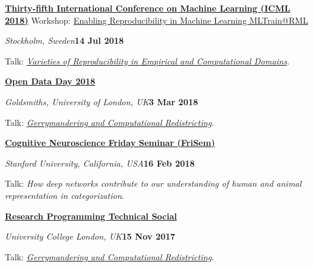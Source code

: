 \documentclass[10pt]{article}
\newenvironment{outerlist}[1][\enskip\textbullet]%
        {\begin{itemize}[#1]}{\end{itemize}%
         \vspace{-.6\baselineskip}}
\newenvironment{innerlist}[1][\enskip\textbullet]%
        {\begin{compactitem}[#1]}{\end{compactitem}}
\begin{document}
\begin{samepage}
\textbf{\href{https://icml.cc}{Thirty-fifth International Conference on Machine Learning (ICML 2018)}}
\newline Workshop: \href{https://mltrain.cc/events/enabling-reproducibility-in-machine-learning-mltrainrml-icml-2018/}{Enabling Reproducibility in Machine Learning MLTrain@RML}
\begin{outerlist}
  \item[] \textit{Stockholm, Sweden}\hfill\textbf{14 Jul 2018}
  \begin{innerlist}
    \item Talk:  \textit{\href{https://figshare.com/articles/Varieties_of_Reproducibility_in_Empirical_and_Computational_Domains/6818018}{Varieties of Reproducibility in Empirical and Computational Domains}}.
  \end{innerlist}
\end{outerlist}
\vspace{8pt}
\end{samepage}

\textbf{\href{http://opendataday.org/}{Open Data Day 2018}}
\begin{outerlist}
  \item[] \textit{Goldsmiths, University of London, UK}\hfill\textbf{3 Mar 2018}
  \begin{innerlist}
    \item Talk:  \textit{\href{http://figshare.com/articles/Gerrymandering_and_Computational_Redistricting/5605387}{Gerrymandering and Computational Redistricting}}.
  \end{innerlist}
\end{outerlist}
\vspace{8pt}

\textbf{\href{https://psychology.stanford.edu/events/frisem}{Cognitive Neuroscience Friday Seminar (FriSem)}}
\begin{outerlist}
  \item[] \textit{Stanford University, California, USA}\hfill\textbf{16 Feb 2018}
  \begin{innerlist}
    \item Talk: \textit{How deep networks contribute to our understanding of human and animal representation in categorization}.
  \end{innerlist}
\end{outerlist}
\vspace{8pt}

\textbf{\href{http://www.ucl.ac.uk/research-it-services/research-software-development/programming-hub/tech-socials}{Research Programming Technical Social}}
\begin{outerlist}
  \item[] \textit{University College London, UK}\hfill\textbf{15 Nov 2017}
  \begin{innerlist}
    \item Talk: \textit{\href{https://figshare.com/articles/Gerrymandering_and_Computational_Redistricting/5605387/3}{Gerrymandering and Computational Redistricting}}.
  \end{innerlist}
\end{outerlist}
\vspace{8pt}
\end{document}
